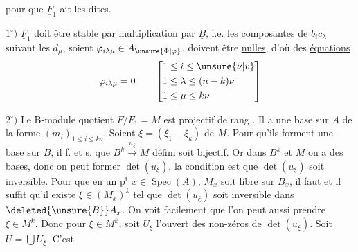 pour que $\underline F_1$ ait les  dites. 

$1^\circ)$ $\underline F_1$ doit être stable par multiplication par $\underline B$,
i.e.  les composantes de $b_i c_\lambda$ suivant
les $d_{\mu}$, soient $\varphi_{i\lambda\mu}\in A_{\unsure{\Phi|\varphi}}$, doivent être
\uline{nulles},  d'où des \uline{équations}
\[
\varphi_{i\lambda\mu}=0\qquad
\left[\begin{aligned}
1&\leq i\leq \unsure{\nu|v}\\
1&\leq\lambda\leq(n-k)\nu\\
1&\leq\mu\leq k\nu
\end{aligned}\right]
\]

$2^\circ)$ Le B-module quotient  $F/F_1=M$
est projectif de rang . Il a une
base sur $A$ de la forme $(m_i)_{1\leq i\leq k\nu}$,
Soient $\xi=(\xi_1\mathbin{-}\xi_k)$    de $M$. Pour qu'ils
forment une base sur $B$, il f. et s. que
$B^k\xrightarrow{u_\xi}M$ défini soit bijectif. Or dans $B^k$ et $M$
on a des bases, donc on peut former
$\det(u_\xi)$, la condition est que $\det(u_\xi)$ soit
inversible.  Pour que
en un $\mathrm{p}^{\mathrm t}$ $x\in\operatorname{Spec}(A)$, $M_x$ soit libre sur $B_x$,
il faut et il suffit qu'il existe
$\xi\in(M_x)^k$ tel que $\det(u_\xi)$ soit inversible
dans $\deleted{\unsure{B}}A_x$. On voit facilement que
l'on peut aussi prendre  $\xi\in M^k$. Donc
pour   $\xi\in M^k$, soit $U_\xi$ l'ouvert
 des non-zéros de $\det(u_\xi)$. Soit $U=\bigcup U_\xi$. C'est
